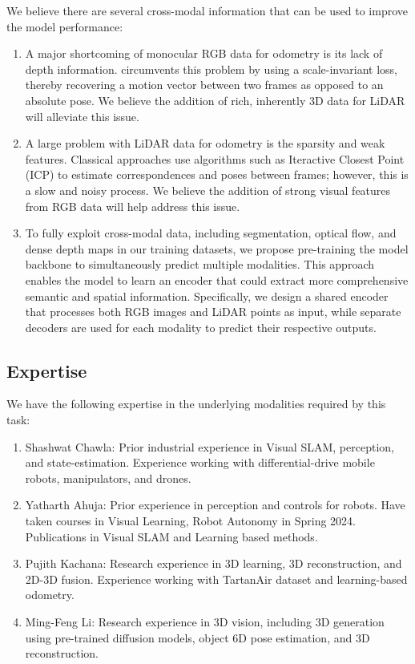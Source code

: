 \documentclass[11pt,a4paper]{article}
\begin{document}
We believe there are several cross-modal information that can be used to improve the model performance:
  \begin{enumerate}
    \item A major shortcoming of monocular RGB data for odometry is its lack of depth information. \cite{tartanvo2020corl} circumvents this problem by using a scale-invariant loss, thereby recovering a motion vector between two frames as opposed to an absolute pose. We believe the addition of rich, inherently 3D data for LiDAR will alleviate this issue.
    
    \item A large problem with LiDAR data for odometry is the sparsity and weak features. Classical approaches use algorithms such as Iteractive Closest Point (ICP) to estimate correspondences and poses between frames; however, this is a slow and noisy process. We believe the addition of strong visual features from RGB data will help address this issue.
    
    \item To fully exploit cross-modal data, including segmentation, optical flow, and dense depth maps in our training datasets, we propose pre-training the model backbone to simultaneously predict multiple modalities. This approach enables the model to learn an encoder that could extract more comprehensive semantic and spatial information. Specifically, we design a shared encoder that processes both RGB images and LiDAR points as input, while separate decoders are used for each modality to predict their respective outputs.
    
  \end{enumerate}
\subsection{Expertise}
We have the following expertise in the underlying modalities required by this task:
  \begin{enumerate}
      \item Shashwat Chawla: Prior industrial experience in Visual SLAM, perception, and state-estimation. Experience working with differential-drive mobile robots, manipulators, and drones.   
      \item Yatharth Ahuja: Prior experience in perception and controls for robots. Have taken courses in Visual Learning, Robot Autonomy in Spring 2024. Publications in Visual SLAM and Learning based methods.
      \item Pujith Kachana: Research experience in 3D learning, 3D reconstruction, and 2D-3D fusion. Experience working with TartanAir dataset and learning-based odometry.
      \item Ming-Feng Li: Research experience in 3D vision, including 3D generation using pre-trained diffusion models, object 6D pose estimation, and 3D reconstruction.
  \end{enumerate}
\end{document}
